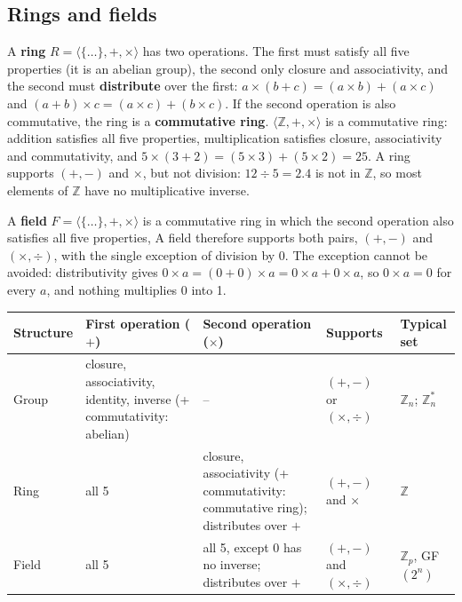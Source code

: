 \subsection{Rings and fields}
A \textbf{ring} $R = \langle \{\dots\}, +, \times \rangle$ has two operations. The first must satisfy all five properties (it is an abelian group), the second only closure and associativity, and the second must \textbf{distribute} over the first: $a \times (b + c) = (a \times b) + (a \times c)$ and $(a + b) \times c = (a \times c) + (b \times c)$. If the second operation is also commutative, the ring is a \textbf{commutative ring}. $\langle \mathbb{Z}, +, \times \rangle$ is a commutative ring: addition satisfies all five properties, multiplication satisfies closure, associativity and commutativity, and $5 \times (3 + 2) = (5 \times 3) + (5 \times 2) = 25$. A ring supports $(+, -)$ and $\times$, but not division: $12 \div 5 = 2.4$ is not in $\mathbb{Z}$, so most elements of $\mathbb{Z}$ have no multiplicative inverse.

A \textbf{field} $F = \langle \{\dots\}, +, \times \rangle$ is a commutative ring in which the second operation also satisfies all five properties,  A field therefore supports both pairs, $(+, -)$ and $(\times, \div)$, with the single exception of division by 0. The exception cannot be avoided: distributivity gives $0 \times a = (0 + 0) \times a = 0 \times a + 0 \times a$, so $0 \times a = 0$ for every $a$, and nothing multiplies 0 into 1.

\begin{mustknow}
\small
\begin{tabularx}{\linewidth}{@{}l X X l l@{}}
\toprule
Structure & First operation ($+$) & Second operation ($\times$) & Supports & Typical set\\
\midrule
Group & closure, associativity, identity, inverse (+ commutativity: abelian) & -- & $(+,-)$ or $(\times,\div)$ & $\mathbb{Z}_n$; $\mathbb{Z}_n^*$\\
Ring & all 5 & closure, associativity (+ commutativity: commutative ring); distributes over $+$ & $(+,-)$ and $\times$ & $\mathbb{Z}$\\
Field & all 5 & all 5, except 0 has no inverse; distributes over $+$ & $(+,-)$ and $(\times,\div)$ & $\mathbb{Z}_p$, GF$(2^n)$\\
\bottomrule
\end{tabularx}
\end{mustknow}

